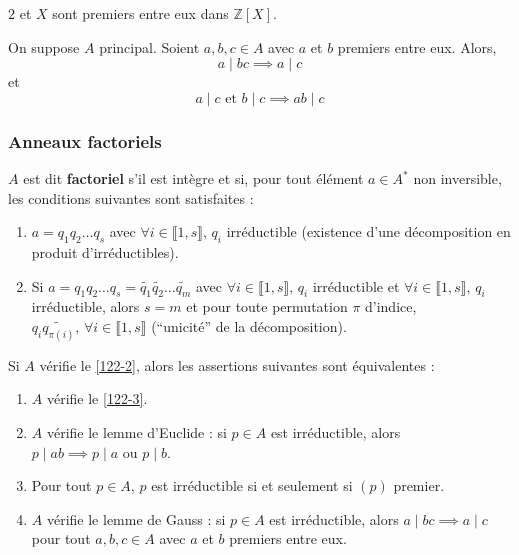 	\begin{example}
		$2$ et $X$ sont premiers entre eux dans $\mathbb{Z}[X]$.
	\end{example}

	\begin{lemma}[Gauss]
		On suppose $A$ principal. Soient $a, b, c \in A$ avec $a$ et $b$ premiers entre eux. Alors,
		\[ a \mid bc \implies a \mid c \]
		et
		\[ a \mid c \text{ et } b \mid c \implies ab \mid c \]
	\end{lemma}

	\subsubsection{Anneaux factoriels}


	\begin{definition}
		$A$ est dit \textbf{factoriel} s'il est intègre et si, pour tout élément $a \in A^*$ non inversible, les conditions suivantes sont satisfaites :
		\begin{enumerate}[label=(\roman*)]
			\item \label{122-2} $a = q_1 q_2 \dots q_s$ avec $\forall i \in \llbracket 1, s \rrbracket, \, q_i$ irréductible (existence d'une décomposition en produit d'irréductibles).
			\item \label{122-3} Si $a = q_1 q_2 \dots q_s = \widetilde{q_1} \widetilde{q_2} \dots \widetilde{q_m}$ avec $\forall i \in \llbracket 1, s \rrbracket, \, q_i$ irréductible et $\forall i \in \llbracket 1, s \rrbracket, \, q_i$ irréductible, alors $s = m$ et pour toute permutation $\pi$ d'indice, $q_i \widetilde{q_{\pi(i)}}, \, \forall i \in \llbracket 1, s \rrbracket$ (``unicité'' de la décomposition).
		\end{enumerate}
	\end{definition}


	\begin{proposition}
		Si $A$ vérifie le \cref{122-2}, alors les assertions suivantes sont équivalentes :
		\begin{enumerate}[label=(\roman*)]
			\item $A$ vérifie le \cref{122-3}.
			\item $A$ vérifie le lemme d'Euclide : si $p \in A$ est irréductible, alors $p \mid ab \implies p \mid a \text { ou } p \mid b$.
			\item Pour tout $p \in A$, $p$ est irréductible si et seulement si $(p)$ premier.
			\item $A$ vérifie le lemme de Gauss : si $p \in A$ est irréductible, alors $a \mid bc \implies a \mid c$ pour tout $a, b, c \in A$ avec $a$ et $b$ premiers entre eux.
		\end{enumerate}
	\end{proposition}

